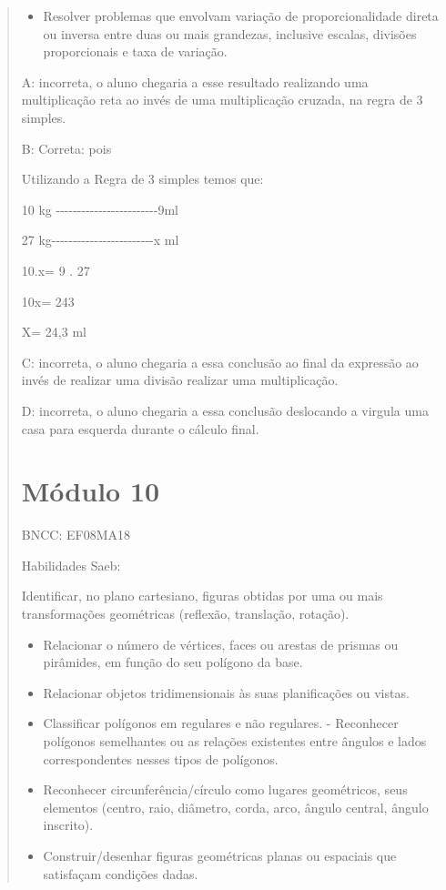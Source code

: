 \begin{quote}
\begin{escolha}
\begin{itemize}
\tightlist
\item
  Resolver problemas que envolvam variação de proporcionalidade direta
  ou inversa entre duas ou mais grandezas, inclusive escalas, divisões
  proporcionais e taxa de variação.
\end{itemize}

A: incorreta, o aluno chegaria a esse resultado realizando uma
multiplicação reta ao invés de uma multiplicação cruzada, na regra de 3
simples.

B: Correta: pois

Utilizando a Regra de 3 simples temos que:

10 kg
-\/-\/-\/-\/-\/-\/-\/-\/-\/-\/-\/-\/-\/-\/-\/-\/-\/-\/-\/-\/-\/-\/-\/-9ml

27
kg-\/-\/-\/-\/-\/-\/-\/-\/-\/-\/-\/-\/-\/-\/-\/-\/-\/-\/-\/-\/-\/-\/-\/-x
ml

10.x= 9 . 27

10x= 243

X= 24,3 ml

C: incorreta, o aluno chegaria a essa conclusão ao final da expressão ao
invés de realizar uma divisão realizar uma multiplicação.

D: incorreta, o aluno chegaria a essa conclusão deslocando a virgula uma
casa para esquerda durante o cálculo final.

\chapter{Módulo 10}

BNCC: EF08MA18

Habilidades Saeb:

Identificar, no plano cartesiano, figuras obtidas por uma ou mais
transformações geométricas (reflexão, translação, rotação).

\begin{itemize}
\item
  Relacionar o número de vértices, faces ou arestas de prismas ou
  pirâmides, em função do seu polígono da base.
\item
  Relacionar objetos tridimensionais às suas planificações ou vistas.
\item
  Classificar polígonos em regulares e não regulares. - Reconhecer
  polígonos semelhantes ou as relações existentes entre ângulos e lados
  correspondentes nesses tipos de polígonos.
\item
  Reconhecer circunferência/círculo como lugares geométricos, seus
  elementos (centro, raio, diâmetro, corda, arco, ângulo central, ângulo
  inscrito).
\item
  Construir/desenhar figuras geométricas planas ou espaciais que
  satisfaçam condições dadas.
\end{itemize}


\end{escolha}
\end{quote}
